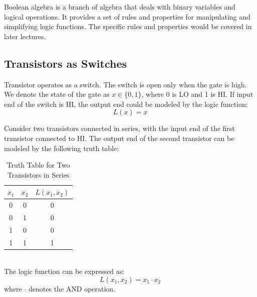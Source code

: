 \documentclass[11pt]{report}
\begin{document}
\begin{definition}
    Boolean algebra is a branch of algebra that deals with binary variables and logical operations. It provides a set of rules and properties for manipulating and simplifying logic functions. The specific rules and properties would be covered in later lectures.
\end{definition}
\subsection{Transistors as Switches}
\begin{definition}[Transistor]
    Transistor operates as a switch. The switch is open only when the gate is high. We denote the state of the gate as $x \in \{0,1\}$, where 0 is LO and 1 is HI. If input end of the switch is HI, the output end could be modeled by the logic function:
    $$
        L(x) = x
    $$
\end{definition}

\begin{example}
    Consider two transistors connected in series, with the input end of the first transistor connected to HI. The output end of the second transistor can be modeled by the following truth table:
    \begin{table}[h!]
        \centering
        \begin{tabular}{|c|c|c|}
            \hline
            $x_1$ & $x_2$ & $L(x_1, x_2)$ \\
            \hline
            0 & 0 & 0 \\
            0 & 1 & 0 \\
            1 & 0 & 0 \\
            1 & 1 & 1 \\
            \hline
        \end{tabular}
        \caption{Truth Table for Two Transistors in Series}
        \label{tab:and_gate}
    \end{table}
    \\
    The logic function can be expressed as:
    $$
        L(x_1, x_2) = x_1 \cdot x_2
    $$
    where $\cdot$ denotes the AND operation.
\end{example}
\end{document}
